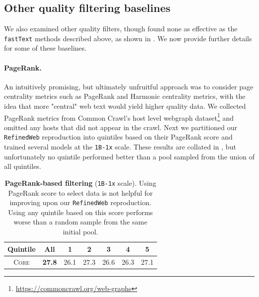 \documentclass{article}
\newcommand{\strack}{\texttt{1B-1x}\xspace}
\newcommand{\rw}{\texttt{RefinedWeb}\xspace}
\newcommand{\fasttext}{\texttt{fastText}\xspace}
\newcommand{\lowvar}{\textsc{Core}\xspace}
\newcommand{\commoncrawl}{Common Crawl\xspace}
\begin{document}
\subsection{Other quality filtering baselines}

We also examined other quality filters, though found none as effective as the \fasttext methods described above, as shown in . We now provide further details for some of these baselines.

\paragraph{PageRank.} An intuitively promising, but ultimately unfruitful approach was to consider page centrality metrics such as PageRank and Harmonic centrality metrics, with the idea that more "central" web text would yield higher quality data. We collected PageRank metrics from \commoncrawl's host level webgraph dataset\footnote{\url{https://commoncrawl.org/web-graphs}} and omitted any hosts that did not appear in the crawl. Next we partitioned our \rw reproduction into quintiles based on their PageRank score and trained several models at the \strack scale. These results are collated in , but unfortunately no quintile performed better than a pool sampled from the union of all quintiles.

\begin{table}[h]
\centering
\caption{\textbf{PageRank-based filtering} (\strack scale). Using PageRank score to select data is not helpful for improving upon our \rw reproduction. Using any quintile based on this score performs worse than a random sample from the same initial pool. }
\label{table:pagerank}
\begin{tabular}{ccccccc}
\toprule
Quintile & All & 1 & 2 & 3 & 4 & 5 \\
\midrule
\lowvar & \textbf{27.8} & 26.1 & 27.3 & 26.6 & 26.3 & 27.1\\
\bottomrule
\end{tabular}
\end{table}
\end{document}
